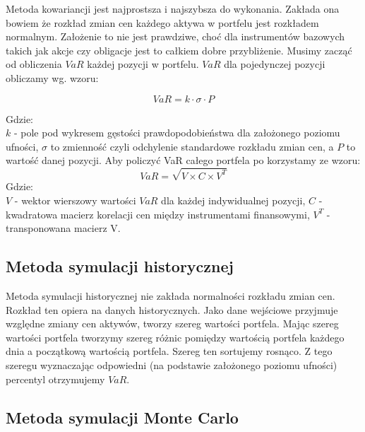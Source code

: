 \documentclass[11pt,titlepage]{article}
\numberwithin{equation}{section}
\begin{document}
Metoda kowariancji jest najprostsza i najszybsza do wykonania. Zakłada ona bowiem że rozkład zmian cen każdego aktywa w portfelu jest rozkładem normalnym. Założenie to nie jest prawdziwe, choć dla instrumentów bazowych takich jak akcje czy obligacje jest to całkiem dobre przybliżenie. Musimy zacząć od obliczenia $VaR$ każdej pozycji w portfelu. $VaR$ dla pojedynczej pozycji obliczamy wg. wzoru:

$$ VaR = k \cdot \sigma \cdot P $$

\noindent Gdzie:\\
\noindent $ k $ - pole pod wykresem gęstości prawdopodobieństwa dla założonego poziomu ufności, 
$ \sigma $ to zmienność czyli odchylenie standardowe rozkładu zmian cen, a $ P $ to wartość danej pozycji.
Aby policzyć VaR całego portfela po korzystamy ze wzoru:
$$ VaR=\sqrt{V \times C \times V^{T}} $$
\noindent Gdzie:\\
\noindent $ V $ - wektor wierszowy wartości $VaR$ dla każdej indywidualnej pozycji, $ C $ - kwadratowa macierz korelacji cen między instrumentami finansowymi, $ V^{T} $ - transponowana macierz V.\\

\subsection{Metoda symulacji historycznej}
Metoda symulacji historycznej nie zakłada normalności rozkładu zmian cen. Rozkład ten opiera na danych historycznych. Jako dane wejściowe przyjmuje względne zmiany cen aktywów, tworzy szereg wartości portfela. Mając szereg wartości portfela tworzymy szereg różnic pomiędzy wartością portfela każdego dnia a początkową wartością portfela. Szereg ten sortujemy rosnąco. Z tego szeregu wyznaczając odpowiedni (na podstawie założonego poziomu ufności) percentyl otrzymujemy $VaR$.\\








\newpage

\subsection{Metoda symulacji Monte Carlo}
\end{document}
